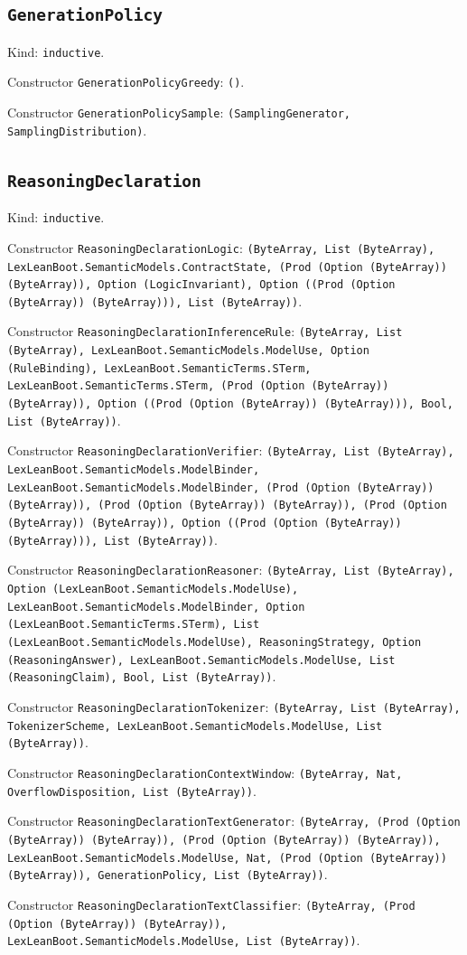 \documentclass[11pt]{article}
\begin{document}
\subsection*{\texttt{GenerationPolicy}}
\noindent Kind: \texttt{inductive}.\par
\noindent Constructor \texttt{GenerationPolicyGreedy}: \texttt{()}.\par
\noindent Constructor \texttt{GenerationPolicySample}: \texttt{(SamplingGenerator, SamplingDistribution)}.\par
\subsection*{\texttt{ReasoningDeclaration}}
\noindent Kind: \texttt{inductive}.\par
\noindent Constructor \texttt{ReasoningDeclarationLogic}: \texttt{(ByteArray, List (ByteArray), LexLeanBoot.SemanticModels.ContractState, (Prod (Option (ByteArray)) (ByteArray)), Option (LogicInvariant), Option ((Prod (Option (ByteArray)) (ByteArray))), List (ByteArray))}.\par
\noindent Constructor \texttt{ReasoningDeclarationInferenceRule}: \texttt{(ByteArray, List (ByteArray), LexLeanBoot.SemanticModels.ModelUse, Option (RuleBinding), LexLeanBoot.SemanticTerms.STerm, LexLeanBoot.SemanticTerms.STerm, (Prod (Option (ByteArray)) (ByteArray)), Option ((Prod (Option (ByteArray)) (ByteArray))), Bool, List (ByteArray))}.\par
\noindent Constructor \texttt{ReasoningDeclarationVerifier}: \texttt{(ByteArray, List (ByteArray), LexLeanBoot.SemanticModels.ModelBinder, LexLeanBoot.SemanticModels.ModelBinder, (Prod (Option (ByteArray)) (ByteArray)), (Prod (Option (ByteArray)) (ByteArray)), (Prod (Option (ByteArray)) (ByteArray)), Option ((Prod (Option (ByteArray)) (ByteArray))), List (ByteArray))}.\par
\noindent Constructor \texttt{ReasoningDeclarationReasoner}: \texttt{(ByteArray, List (ByteArray), Option (LexLeanBoot.SemanticModels.ModelUse), LexLeanBoot.SemanticModels.ModelBinder, Option (LexLeanBoot.SemanticTerms.STerm), List (LexLeanBoot.SemanticModels.ModelUse), ReasoningStrategy, Option (ReasoningAnswer), LexLeanBoot.SemanticModels.ModelUse, List (ReasoningClaim), Bool, List (ByteArray))}.\par
\noindent Constructor \texttt{ReasoningDeclarationTokenizer}: \texttt{(ByteArray, List (ByteArray), TokenizerScheme, LexLeanBoot.SemanticModels.ModelUse, List (ByteArray))}.\par
\noindent Constructor \texttt{ReasoningDeclarationContextWindow}: \texttt{(ByteArray, Nat, OverflowDisposition, List (ByteArray))}.\par
\noindent Constructor \texttt{ReasoningDeclarationTextGenerator}: \texttt{(ByteArray, (Prod (Option (ByteArray)) (ByteArray)), (Prod (Option (ByteArray)) (ByteArray)), LexLeanBoot.SemanticModels.ModelUse, Nat, (Prod (Option (ByteArray)) (ByteArray)), GenerationPolicy, List (ByteArray))}.\par
\noindent Constructor \texttt{ReasoningDeclarationTextClassifier}: \texttt{(ByteArray, (Prod (Option (ByteArray)) (ByteArray)), LexLeanBoot.SemanticModels.ModelUse, List (ByteArray))}.\par
\end{document}
